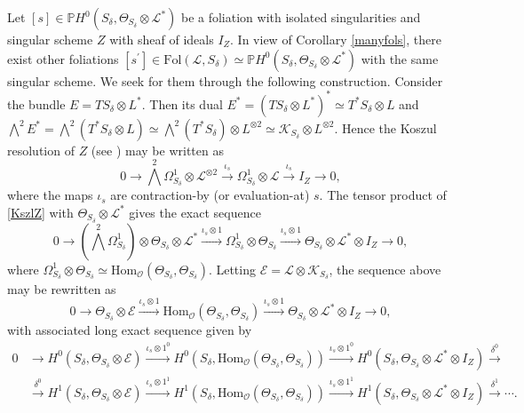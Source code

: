 \documentclass{amsart} %
\theoremstyle{definition}
\newcommand{\cts}{\Theta_{S_{\delta}}}
\newcommand{\cs}{S_{\delta}}
\newcommand{\PP}{\mathbb{P}}
\newcommand{\mcL}{\mathcal{L}}
\newcommand{\mcO}{\mathcal{O}}
\newcommand{\mcK}{\mathcal{K}}
\newcommand{\mcE}{\mathcal{E}}
\begin{document}

Let $ [s] \in \PP H^{0}( S_{\delta}, \cts \otimes \mcL^{*}) $
be a foliation with isolated singularities and singular scheme $ Z $ with sheaf of ideals $ I_Z $.
In view of Corollary \ref{manyfols}, there exist other foliations $ [s^{\prime}] \in \mathrm{Fol}(\mcL,\cs) \simeq
 \PP H^{0}( S_{\delta}, \cts \otimes \mcL^{*})$
with the same singular scheme. We seek for them through the following construction. Consider the bundle $ E = T\cs \otimes L^* $. Then its dual
 $ E^* = (T\cs \otimes L^*)^* \simeq T^*\cs \otimes L $
 and $ \bigwedge^2 E^* = \bigwedge^2 (T^*\cs \otimes L)
 \simeq \bigwedge^2 (T^*\cs)\otimes L^{\otimes 2}
  \simeq \mcK_{\cs}\otimes L^{\otimes 2}$. Hence the Koszul resolution of $ Z $ (see \cite{Cam-Oli})
  may be written as
 \begin{equation}\label{KszlZ}
      0 \longrightarrow \bigwedge^2 \Omega_{\cs}^1 \otimes \mcL^{\otimes 2} \stackrel{ \iota_{s} }\longrightarrow
       \Omega_{\cs}^1 \otimes \mcL \stackrel{ \iota_{s} }{\longrightarrow}
        I_Z \longrightarrow 0,
 \end{equation}
 where the maps $ \iota_{s} $ are contraction-by (or evaluation-at) $ s $.
 The tensor product of \eqref{KszlZ} with $ \cts \otimes \mcL^*  $ gives the exact sequence
 \[
 0 \longrightarrow ( \bigwedge^2 \Omega_{\cs}^1 )\otimes \cts \otimes \mcL^* \stackrel{\iota_{s}\otimes 1}\longrightarrow
       \Omega_{\cs}^1\otimes \cts \stackrel{\iota_{s}\otimes 1}{\longrightarrow}
        \cts \otimes \mcL^* \otimes I_Z  \longrightarrow 0,
 \]
where
 $ \Omega_{\cs}^1\otimes \cts \simeq \mathrm{Hom}_{ \mcO} (\cts, \cts) $.
Letting $ \mcE = \mcL \otimes \mcK_{\cs} $, the sequence above may be rewritten as
 \begin{equation}\label{twistedKszlZ}
  0 \longrightarrow \cts \otimes \mcE \stackrel{\iota_{s}\otimes 1}\longrightarrow
   \mathrm{Hom}_{ \mcO} (\cts, \cts) \stackrel{\iota_{s}\otimes 1}\longrightarrow
    \cts \otimes \mcL^* \otimes I_Z  \longrightarrow 0,
 \end{equation}
 with associated long exact sequence given by
\begin{equation}\label{LeCtKszlZ}
 \begin{split}
    0 & \rightarrow H^0(\cs, \cts \otimes \mcE)\xrightarrow{{\iota_{s}\otimes 1}^0}
       H^0(\cs, \mathrm{Hom}_{ \mcO} (\cts, \cts) ) \xrightarrow{{\iota_{s}\otimes 1}^0}
        H^0(\cs, \cts \otimes \mcL^* \otimes I_Z ) \xrightarrow{\delta^0}  \\
      &      \xrightarrow{\delta^0}
       H^1(\cs, \cts \otimes \mcE) \xrightarrow{{\iota_{s}\otimes 1}^1}
        H^1(\cs, \mathrm{Hom}_{ \mcO} (\cts, \cts) ) \xrightarrow{{\iota_{s}\otimes 1}^1}
         H^1(\cs, \cts \otimes \mcL^* \otimes I_Z ) \xrightarrow{\delta^1}
       \cdots .
 \end{split}
\end{equation}
\end{document}
